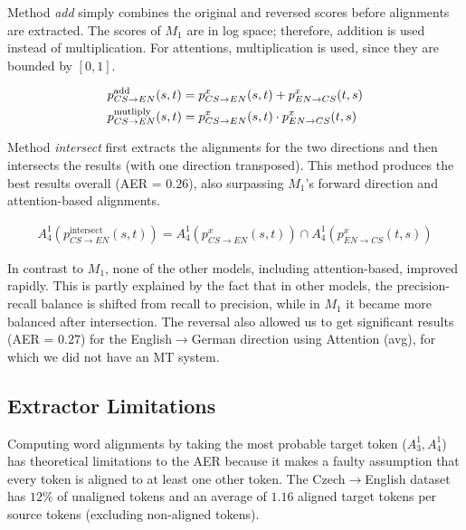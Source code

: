 Method \textit{add} simply combines the original and reversed scores before alignments are extracted. The scores of $M_1$ are in log space; therefore, addition is used instead of multiplication. For attentions, multiplication is used, since they are bounded by $[0,1]$.

\vspace*{-0.3cm}
\begin{gather*}
    p_{CS\rightarrow EN}^\text{add}(s, t) = p^x_{CS\rightarrow EN}(s, t)+p^x_{EN\rightarrow CS}(t, s) \\
    p_{CS\rightarrow EN}^\text{mutliply}(s, t) = p^x_{CS\rightarrow EN}(s, t)\cdot p^x_{EN\rightarrow CS}(t, s)\hspace{0.17cm}
\end{gather*}
\vspace*{0.0cm}

Method \textit{intersect} first extracts the alignments for the two directions and then intersects the results (with one direction transposed). This method produces the best results overall (AER = $0.26$), also surpassing $M_1$'s forward direction and attention-based alignments.

\vspace*{-0.3cm}
\begin{gather*}
    A_4^1(p_{CS\rightarrow EN}^\text{intersect}(s, t)) = A_4^1(p^x_{CS\rightarrow EN}(s, t))\cap A_4^1(p^x_{EN\rightarrow CS}(t, s))
\end{gather*}
\vspace*{0.0cm}

In contrast to $M_1$, none of the other models, including attention-based, improved rapidly. This is partly explained by the fact that in other models, the precision-recall balance is shifted from recall to precision, while in $M_1$ it became more balanced after intersection. The reversal also allowed us to get significant results (AER = $0.27$) for the English$\rightarrow$German direction using Attention (avg), for which we did not have an MT system.

\subsection{Extractor Limitations}

Computing word alignments by taking the most probable target token ($A_3^1, A_4^1$) has theoretical limitations to the AER because it makes a faulty assumption that every token is aligned to at least one other token. The Czech$\rightarrow$English dataset has $12\%$ of unaligned tokens and an average of $1.16$ aligned target tokens per source tokens (excluding non-aligned tokens). 

